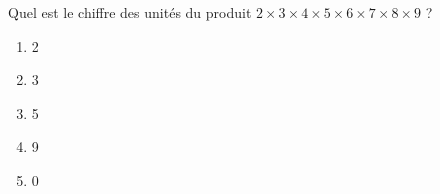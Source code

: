 Quel est le chiffre des unités du produit $2\times3\times4\times5\times6\times7\times8\times9$ ?
\begin{multicols}{5}
  \begin{enumerate}[A/]
  \item 2
  \item 3
  \item 5
  \item 9
  \item 0
  \end{enumerate}
\end{multicols}